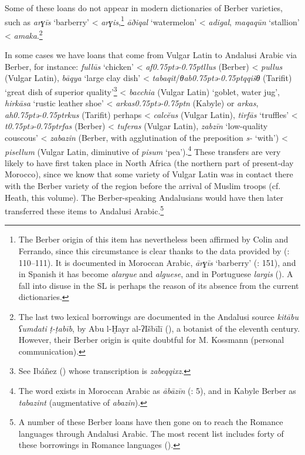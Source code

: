 \documentclass[output=paper,modfonts,nonflat]{langsci/langscibook}
\begin{document}
Some of these loans do not appear in modern dictionaries of Berber varieties, such as \textit{arɣīs} ‘barberry’ < \textit{arɣis},\footnote{The Berber origin of this item has nevertheless been affirmed by Colin and Ferrando, since this circumstance is clear thanks to the data provided by  (\citealt{Ferrando1997}: 110–111). It is documented in Moroccan Arabic, \textit{ārɣīs} ‘barberry’ (\citealt{Prémare1995}: 151), and in Spanish it has become \textit{alargue} and \textit{alguese}, and in Portuguese \textit{largis} (\citealt{CorrientePereiraVicenteforthcoming}). A fall into disuse in the SL is perhaps the reason of its absence from the current dictionaries.} \textit{āðiqal} ‘watermelon’ < \textit{adigal}, \textit{maqaqūn} ‘stallion’ < \textit{amaka}.\footnote{The last two lexical borrowings are documented in the Andalusi source \textit{kitābu} \textit{ʕumdati} \textit{ṭ-ṭabīb}, by Abu l-Ḫayr al-ʔIšbīlī (\citeyear{Abūl-Ḫayral-Išbīlī2004,Abūl-Ḫayral-Išbīlī2007}), a botanist of the eleventh century. However, their Berber origin is quite doubtful for M. Kossmann (personal communication).} 

In some cases we have loans that come from Vulgar Latin to Andalusi Arabic via Berber, for instance: \textit{fullūs} ‘chicken’ < \textit{af\kern 0.75ptǝ\kern -0.75ptllus} (Berber) < \textit{pullus} (Vulgar Latin), \textit{bāqya} ‘large clay dish’ < \textit{tabaqit}/\textit{θab\kern 0.75ptǝ\kern -0.75ptqqišθ} (Tarifit) ‘great dish of superior quality’\footnote{See Ibáñez (\citeyear[272]{Ibáñez1949}) whose transcription is \textit{zabeqqixz}.} < \textit{bacchia} (Vulgar Latin) ‘goblet, water jug’, \textit{hirkāsa} ‘rustic leather shoe’ < \textit{arkas\kern 0.75ptǝ\kern -0.75ptn} (Kabyle) or \textit{arkas}, \textit{ah\kern 0.75ptǝ\kern -0.75ptrkus} (Tarifit) perhaps < \textit{calcĕus} (Vulgar Latin), \textit{tirfās} ‘truffles’ < \textit{t\kern 0.75ptǝ\kern -0.75ptrfas} (Berber) < \textit{tuferas} (Vulgar Latin), \textit{zabzīn} ‘low-quality couscous’ < \textit{zabazin} (Berber, {with  agglutination of the preposition} \textit{s-} ‘with’) < \textit{pisellum} (Vulgar Latin, diminutive of \textit{pisum} ‘pea’).\footnote{The word exists in Moroccan Arabic as \textit{ābāzīn} (\citealt{Prémare1993}: 5), and in Kabyle Berber as \textit{tabazint} (augmentative of \textit{abazin}).}  These transfers are very likely to have first taken place in North Africa (the northern part of present-day Morocco), since we know that some variety of Vulgar Latin was in contact there with the Berber variety of the region before the arrival of Muslim troops (cf. Heath, this volume). The Berber-speaking Andalusians would have then later transferred these items to Andalusi Arabic.\footnote{A number of these Berber loans have then gone on to reach the Romance languages through Andalusi Arabic. The most recent list includes forty of these borrowings in Romance languages (\citealt{CorrientePereiraVicente2019}).}  
\end{document}
